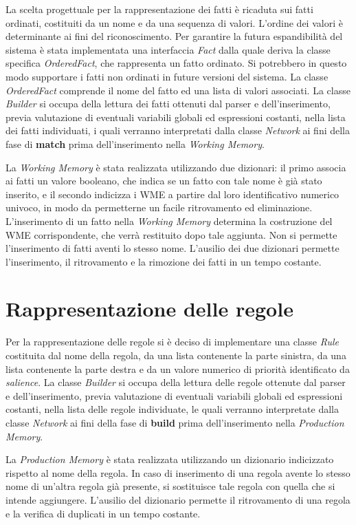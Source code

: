 La scelta progettuale per la rappresentazione dei fatti è ricaduta sui fatti ordinati, costituiti da un nome e da una sequenza di valori. L'ordine dei valori è determinante ai fini del riconoscimento. Per garantire la futura espandibilità del sistema è stata implementata una interfaccia \emph{Fact} dalla quale deriva la classe specifica \emph{OrderedFact}, che rappresenta un fatto ordinato. Si potrebbero in questo modo supportare i fatti non ordinati in future versioni del sistema. La classe \emph{OrderedFact} comprende il nome del fatto ed una lista di valori associati. La classe \emph{Builder} si occupa della lettura dei fatti ottenuti dal parser e dell'inserimento, previa valutazione di eventuali variabili globali ed espressioni costanti, nella lista dei fatti individuati, i quali verranno interpretati dalla classe \emph{Network} ai fini della fase di \textbf{match} prima dell'inserimento nella \emph{Working Memory}.

La \emph{Working Memory} è stata realizzata utilizzando due dizionari: il primo associa ai fatti un valore booleano, che indica se un fatto con tale nome è già stato inserito, e il secondo indicizza i WME a partire dal loro identificativo numerico univoco, in modo da permetterne un facile ritrovamento ed eliminazione. L'inserimento di un fatto nella \emph{Working Memory} determina la costruzione del WME corrispondente, che verrà restituito dopo tale aggiunta. Non si permette l'inserimento di fatti aventi lo stesso nome. L'ausilio dei due dizionari permette l'inserimento, il ritrovamento e la rimozione dei fatti in un tempo costante.

\section{Rappresentazione delle regole}
Per la rappresentazione delle regole si è deciso di implementare una classe \emph{Rule} costituita dal nome della regola, da una lista contenente la parte sinistra, da una lista contenente la parte destra e da un valore numerico di priorità identificato da \emph{salience}. La classe \emph{Builder} si occupa della lettura delle regole ottenute dal parser e dell'inserimento, previa valutazione di eventuali variabili globali ed espressioni costanti, nella lista delle regole individuate, le quali verranno interpretate dalla classe \emph{Network} ai fini della fase di \textbf{build} prima dell'inserimento nella \emph{Production Memory}.

La \emph{Production Memory} è stata realizzata utilizzando un dizionario indicizzato rispetto al nome della regola. In caso di inserimento di una regola avente lo stesso nome di un'altra regola già presente, si sostituisce tale regola con quella che si intende aggiungere. L'ausilio del dizionario permette il ritrovamento di una regola e la verifica di duplicati in un tempo costante.


